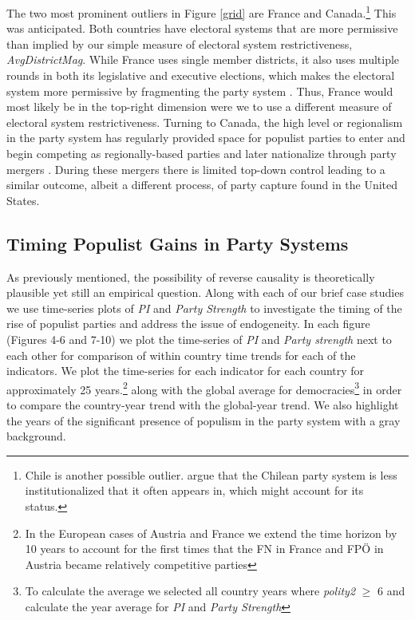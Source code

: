 \documentclass[a4paper,12pt]{article}\usepackage[]{graphicx}\usepackage[]{color}
\begin{document}
\par
The two most prominent outliers in Figure \ref{grid} are France and Canada.\footnote{Chile is another possible outlier. \citet{luna2011uprooted} argue that the Chilean party system is less institutionalized that it often appears in, which might account for its status.} This was anticipated. Both countries have electoral systems that are more permissive than implied by our simple measure of electoral system restrictiveness,  \textit{AvgDistrictMag}. While France uses single member districts, it also uses multiple rounds in both its legislative and executive elections, which makes the electoral system more permissive by fragmenting the party system \citep{birch2003two}. Thus, France would most likely be in the top-right dimension were we to use a different measure of electoral system restrictiveness. Turning to Canada, the high level or regionalism in the party system has regularly provided space for populist parties to enter and begin competing as regionally-based parties and later nationalize through party mergers \citep{behiels2010stephen}. During these mergers there is limited top-down control leading to a similar outcome, albeit a different process, of party capture found in the United States.
\par
\subsection*{Timing Populist Gains in Party Systems}
As previously mentioned, the possibility of reverse causality is theoretically plausible yet still an empirical question. Along with each of our brief case studies we use time-series plots of \textit{PI} and \textit{Party Strength} to investigate the timing of the rise of populist parties and address the issue of endogeneity. In each figure (Figures 4-6 and 7-10) we plot the time-series of \textit{PI} and \textit{Party strength} next to each other for comparison of within country time trends for each of the indicators. We plot the time-series for each indicator for each country for approximately 25 years.\footnote{In the European cases of Austria and France we extend the time horizon by 10 years to account for the first times that the FN in France and FP\"{O} in Austria became relatively competitive parties} along with the global average for democracies\footnote{To calculate the average we selected all country years where \textit{polity2} $\geq$ 6 and calculate the year average for \textit{PI} and \textit{Party Strength}} in order to compare the country-year trend with the global-year trend. We also highlight the years of the significant presence of populism in the party system with a gray background.
\end{document}
